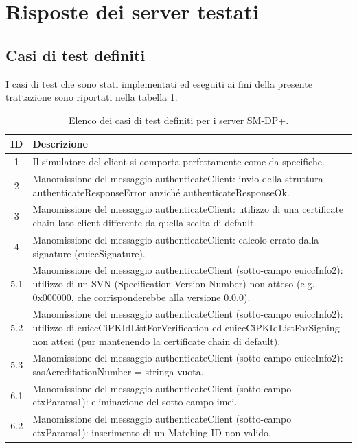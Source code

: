 \documentclass[10pt, oneside]{book}
\begin{document}
\section{Risposte dei server testati}
\subsection{Casi di test definiti}
I casi di test che sono stati implementati ed eseguiti ai fini della presente trattazione sono riportati nella tabella \ref{tab:test-cases}.\\
\begin{table}[h!]
\begin{center}
\captionsetup{skip=4pt}
\caption{Elenco dei casi di test definiti per i server SM-DP+.}
\label{tab:test-cases}
\begin{tabularx}{\textwidth}{|c|X|} %
\hline
\textbf{ID} & \textbf{Descrizione}\\
\hline
1 & Il simulatore del client si comporta perfettamente come da specifiche.\\
\hline
2 & Manomissione del messaggio authenticateClient: invio della struttura authenticateResponseError anziché authenticateResponseOk.\\
\hline
3 & Manomissione del messaggio authenticateClient: utilizzo di una certificate chain lato client differente da quella scelta di default.\\
\hline
4 & Manomissione del messaggio authenticateClient: calcolo errato dalla signature (euiccSignature).\\
\hline
5.1 & Manomissione del messaggio authenticateClient (sotto-campo euiccInfo2): utilizzo di un SVN (Specification Version Number) non atteso (e.g. 0x000000, che corrisponderebbe alla versione 0.0.0).\\
\hline
5.2 & Manomissione del messaggio authenticateClient (sotto-campo euiccInfo2): utilizzo di euiccCiPKIdListForVerification ed euiccCiPKIdListForSigning non attesi (pur mantenendo la certificate chain di default).\\
\hline
5.3 & Manomissione del messaggio authenticateClient (sotto-campo euiccInfo2): sasAcreditationNumber = stringa vuota.\\
\hline
6.1 & Manomissione del messaggio authenticateClient (sotto-campo ctxParams1): eliminazione del sotto-campo imei.\\
\hline
6.2 & Manomissione del messaggio authenticateClient (sotto-campo ctxParams1): inserimento di un Matching ID non valido.\\

\end{tabularx}
\end{center}
\end{table}
\end{document}
